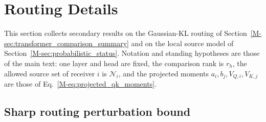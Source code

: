\documentclass[twoside,11pt]{article}
\begin{document}
\section{Routing Details}
\label{supp:routing}

This section collects secondary results on the Gaussian-KL routing of Section~\ref{M-sec:transformer_comparison_summary} and on the local source model of Section~\ref{M-sec:probabilistic_status}. Notation and standing hypotheses are those of the main text: one layer and head are fixed, the comparison rank is $r_h$, the allowed source set of receiver $i$ is $\mathcal N_i$, and the projected moments $a_i,b_j,V_{Q,i},V_{K,j}$ are those of Eq.~\eqref{M-eq:projected_qk_moments}.

\subsection{Sharp routing perturbation bound}
\label{supp:sharp_bound}
\end{document}
